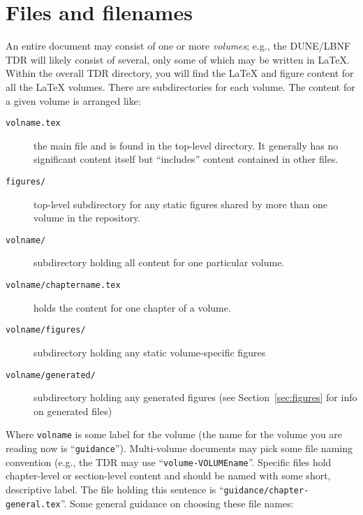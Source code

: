 \section{Files and filenames}
\label{sec:files}

An entire document may consist of one or more \textit{volumes}; e.g.,
the DUNE/LBNF TDR will likely consist of several, only some of which may be written in
\LaTeX{}.
Within the overall TDR directory, you will find the \LaTeX{} and figure content for all the \LaTeX{} volumes. There are subdirectories for each volume. The content for a given volume is
arranged like:

\begin{description}
\item[\texttt{volname.tex}] the main file and is found in the top-level
  directory. It generally has no significant content itself but
  ``includes'' content contained in other files.
\item[\texttt{figures/}] top-level subdirectory for any static figures
  shared by more than one volume in the repository.
\item[\texttt{volname/}] subdirectory holding all content for one particular volume.
\item[\texttt{volname/chaptername.tex}] holds the content for one
  chapter of a volume.
\item[\texttt{volname/figures/}] subdirectory holding any static volume-specific figures
\item[\texttt{volname/generated/}] subdirectory holding any generated
  figures (see Section~\ref{sec:figures} for info on generated files)
\end{description}

Where \texttt{volname} is some label for the volume (the name for the
volume you are reading now is ``\texttt{guidance}'').
Multi-volume documents may pick some file naming convention (e.g., the
TDR may use ``\texttt{volume-VOLUMEname}''.
Specific files hold chapter-level or section-level content and should be named with some
short, descriptive label.
The file holding this sentence is ``\texttt{guidance/chapter-general.tex}''.
Some general guidance on choosing these file names:

